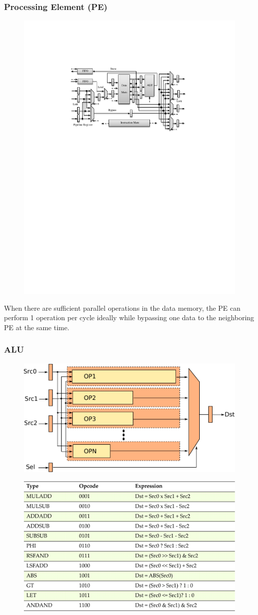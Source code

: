 \documentclass[accentcolor=tud1a,colorbacktitle,inverttitle,landscape,german,presentation,t]{tudbeamer}
\begin{document}
  \begin{frame}
  \frametitle{Processing Element (PE)}
  \vspace{1em}
  \begin{figure}
     \includegraphics[width=.75\linewidth]{pe}
  \end{figure}
 When there are sufficient parallel operations in the data memory, the PE can perform 1 operation per cycle ideally while bypassing one data to the neighboring PE at the same time.
  \end{frame}

  \begin{frame}
  \frametitle{ALU}
  \vspace{-1em}
  \begin{figure}
    \includegraphics[width=.55\linewidth]{alu}
  \end{figure}
  \vspace{-0.5em}
  \begin{figure}
    \includegraphics[width=.55\linewidth]{op-table}
  \end{figure}
  \end{frame}
\end{document}
